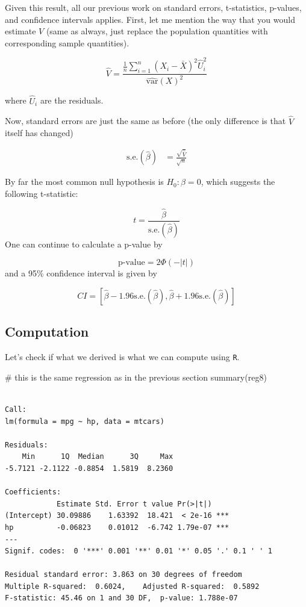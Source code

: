 \documentclass[
  letterpaper,
  DIV=11,
  numbers=noendperiod]{scrreprt}
\newenvironment{Shaded}{\begin{snugshade}}{\end{snugshade}}
\newcommand{\CommentTok}[1]{\textcolor[rgb]{0.37,0.37,0.37}{#1}}
\newcommand{\FunctionTok}[1]{\textcolor[rgb]{0.28,0.35,0.67}{#1}}
\newcommand{\NormalTok}[1]{\textcolor[rgb]{0.00,0.23,0.31}{#1}}
\begin{document}
Given this result, all our previous work on standard errors,
t-statistics, p-values, and confidence intervals applies. First, let me
mention the way that you would estimate \(V\) (same as always, just
replace the population quantities with corresponding sample quantities).

\[
  \hat{V} = \frac{ \frac{1}{n} \displaystyle \sum_{i=1}^n (X_i - \bar{X})^2 \hat{U}_i^2}{\widehat{\mathrm{var}}(X)^2}
\]

where \(\hat{U}_i\) are the residuals.

Now, standard errors are just the same as before (the only difference is
that \(\hat{V}\) itself has changed)

\[
\begin{aligned}
  \textrm{s.e.}(\hat{\beta}) &= \frac{\sqrt{\hat{V}}}{\sqrt{n}}
\end{aligned}
\]

By far the most common null hypothesis is \(H_0: \beta = 0\), which
suggests the following t-statistic:

\[
  t = \frac{\hat{\beta}}{\textrm{s.e.}(\hat{\beta})}
\] One can continue to calculate a p-value by

\[
  \textrm{p-value} = 2 \Phi(-|t|)
\] and a 95\% confidence interval is given by

\[
  CI = [\hat{\beta} - 1.96 \textrm{s.e.}(\hat{\beta}), \hat{\beta} + 1.96 \textrm{s.e.}(\hat{\beta})]
\]

\subsection{Computation}\label{computation-7}

Let's check if what we derived is what we can compute using \texttt{R}.

\begin{Shaded}
\begin{Highlighting}[]
\CommentTok{\# this is the same regression as in the previous section}
\FunctionTok{summary}\NormalTok{(reg8)}
\end{Highlighting}
\end{Shaded}

\begin{verbatim}

Call:
lm(formula = mpg ~ hp, data = mtcars)

Residuals:
    Min      1Q  Median      3Q     Max 
-5.7121 -2.1122 -0.8854  1.5819  8.2360 

Coefficients:
            Estimate Std. Error t value Pr(>|t|)    
(Intercept) 30.09886    1.63392  18.421  < 2e-16 ***
hp          -0.06823    0.01012  -6.742 1.79e-07 ***
---
Signif. codes:  0 '***' 0.001 '**' 0.01 '*' 0.05 '.' 0.1 ' ' 1

Residual standard error: 3.863 on 30 degrees of freedom
Multiple R-squared:  0.6024,    Adjusted R-squared:  0.5892 
F-statistic: 45.46 on 1 and 30 DF,  p-value: 1.788e-07
\end{verbatim}
\end{document}
